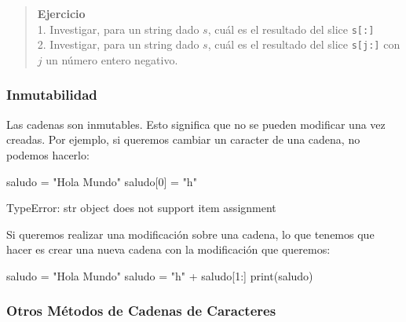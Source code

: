 \documentclass[
  letterpaper,
  DIV=11,
  numbers=noendperiod]{scrreprt}
\newenvironment{Shaded}{\begin{snugshade}}{\end{snugshade}}
\newcommand{\BuiltInTok}[1]{\textcolor[rgb]{0.00,0.23,0.31}{#1}}
\newcommand{\DecValTok}[1]{\textcolor[rgb]{0.68,0.00,0.00}{#1}}
\newcommand{\NormalTok}[1]{\textcolor[rgb]{0.00,0.23,0.31}{#1}}
\newcommand{\OperatorTok}[1]{\textcolor[rgb]{0.37,0.37,0.37}{#1}}
\newcommand{\StringTok}[1]{\textcolor[rgb]{0.13,0.47,0.30}{#1}}
\begin{document}
\begin{quote}
\textbf{Ejercicio}\\
1. Investigar, para un string dado \(s\), cuál es el resultado del slice
\texttt{s{[}:{]}}\\
2. Investigar, para un string dado \(s\), cuál es el resultado del slice
\texttt{s{[}j:{]}} con \(j\) un número entero negativo.
\end{quote}

\hypertarget{inmutabilidad}{%
\subsubsection{Inmutabilidad}\label{inmutabilidad}}

Las cadenas son inmutables. Esto significa que no se pueden modificar
una vez creadas. Por ejemplo, si queremos cambiar un caracter de una
cadena, no podemos hacerlo:

\begin{Shaded}
\begin{Highlighting}[]
\NormalTok{saludo }\OperatorTok{=} \StringTok{"Hola Mundo"}
\NormalTok{saludo[}\DecValTok{0}\NormalTok{] }\OperatorTok{=} \StringTok{"h"}
\end{Highlighting}
\end{Shaded}

\begin{Shaded}
\begin{Highlighting}[]
\NormalTok{TypeError: \textquotesingle{}str\textquotesingle{} object does not support item assignment}
\end{Highlighting}
\end{Shaded}

Si queremos realizar una modificación sobre una cadena, lo que tenemos
que hacer es crear una nueva cadena con la modificación que queremos:

\begin{Shaded}
\begin{Highlighting}[]
\NormalTok{saludo }\OperatorTok{=} \StringTok{"Hola Mundo"}
\NormalTok{saludo }\OperatorTok{=} \StringTok{"h"} \OperatorTok{+}\NormalTok{ saludo[}\DecValTok{1}\NormalTok{:]}
\BuiltInTok{print}\NormalTok{(saludo)}
\end{Highlighting}
\end{Shaded}

\hypertarget{otros-muxe9todos-de-cadenas-de-caracteres}{%
\subsubsection{Otros Métodos de Cadenas de
Caracteres}\label{otros-muxe9todos-de-cadenas-de-caracteres}}
\end{document}
